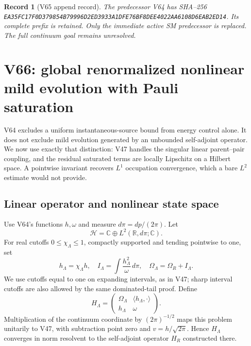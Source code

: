 \documentclass[11pt]{article}
\newtheorem{record}[theorem]{Record}
\theoremstyle{remark}
\begin{document}
\begin{record}[V65 append record]
\label{rec:v20v65}
The predecessor V64 has SHA--256
\texttt{EA35FC17F0D379854B79996D2ED3933A1DFE76BF8DEE4022AA6108D6EAB2ED14}.
Its complete prefix is retained.  Only the immediate
active SM predecessor is replaced.  The full continuum
goal remains unresolved.
\end{record}


\section{V66: global renormalized nonlinear mild evolution with Pauli saturation}
\label{sec:v20v66}

V64 excludes a uniform instantaneous-source bound from
energy control alone.  It does not exclude mild evolution
generated by an unbounded self-adjoint operator.  We now
use exactly that distinction: V47 handles the singular
linear parent--pair coupling, and the residual saturated
terms are locally Lipschitz on a Hilbert space.  A
pointwise invariant recovers \(L^1\) occupation convergence,
which a bare \(L^2\) estimate would not provide.

\subsection{Linear operator and nonlinear state space}

Use V64's functions \(h,\omega\) and measure
\(d\pi=dp/(2\pi)\).  Let
\[
 \mathcal H=\mathbb C\oplus L^2(\mathbb R,d\pi;\mathbb C).
\]
For real cutoffs \(0\leq\chi_\Lambda\leq1\), compactly
supported and tending pointwise to one, set
\[
 h_\Lambda=\chi_\Lambda h,\quad
 I_\Lambda=\int\frac{h_\Lambda^2}{\omega}\,d\pi,\quad
 \Omega_\Lambda=\Omega_R+I_\Lambda .
\]
We use cutoffs equal to one on expanding intervals,
as in V47; sharp interval cutoffs are also allowed
by the same dominated-tail proof.  Define
\[
 H_\Lambda=
 \begin{pmatrix}
 \Omega_\Lambda&\langle h_\Lambda,\cdot\rangle\\
 h_\Lambda&\omega
 \end{pmatrix}.
\]
Multiplication of the continuum coordinate by
\((2\pi)^{-1/2}\) maps this problem unitarily to V47,
with subtraction point zero and \(v=h/\sqrt{2\pi}\).
Hence \(H_\Lambda\) converges in norm resolvent to
the self-adjoint operator \(H_R\) constructed there.
\end{document}
